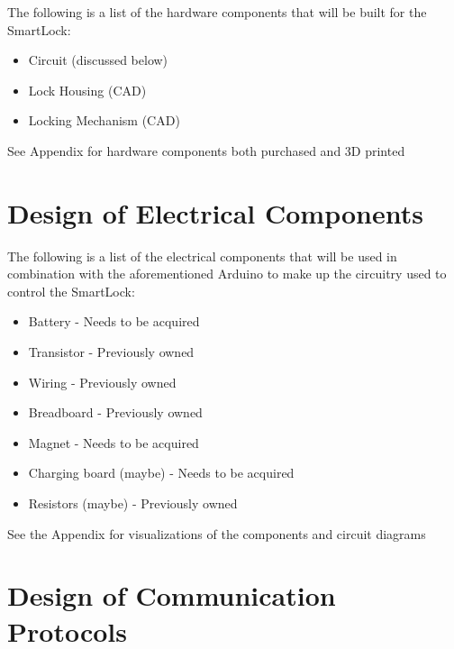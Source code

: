 \documentclass[12pt, titlepage]{article}
\begin{document}
The following is a list of the hardware components that will be built for the SmartLock:
\begin{itemize}
\item Circuit (discussed below)
\item Lock Housing (CAD)
\item Locking Mechanism (CAD)
\end{itemize}

See Appendix for hardware components both purchased and 3D printed


\section{Design of Electrical Components}

The following is a list of the electrical components that will be used in combination with the aforementioned Arduino to make up the circuitry used to control the SmartLock:
\begin{itemize}
\item Battery
\subitem - Needs to be acquired
\item Transistor
\subitem - Previously owned
\item Wiring
\subitem - Previously owned
\item Breadboard
\subitem - Previously owned
\item Magnet
\subitem - Needs to be acquired
\item Charging board (maybe)
\subitem - Needs to be acquired
\item Resistors (maybe)
\subitem - Previously owned
\end{itemize}

See the Appendix for visualizations of the components and circuit diagrams


\section{Design of Communication Protocols}
\end{document}
